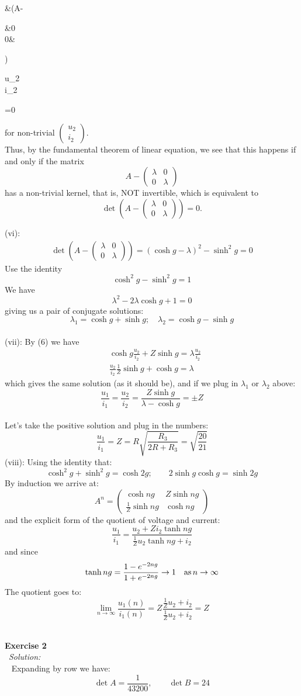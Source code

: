 \documentclass[12pt]{article}
\def\lam{\lambda}
\def\es#1#2{{\bf Exercise #1}\\~{\it Solution:}\\~#2\\[1em]}
\def\inn#1#2{(#1): #2\\[0.5em]}
\def\ff#1#2{\frac{#1}{#2}}
\newcommand{\eq}[1]{\begin{align*}#1\end{align*}}
\newcommand{\mm}[1]{\begin{pmatrix}#1\end{pmatrix}}
\def\sq#1{\sqrt{#1}}
\begin{document}
{{{{	&\iff \left(A-\mm{\lam&0\\0&\lam}\right)\mm{u_2\\i_2}=0
	}
	for non-trivial $\mm{u_2\\i_2}$.\\[0.7 em]
	Thus, by the fundamental theorem of linear equation, we see that this happens if and only if the matrix
	\[
	A-\mm{\lam&0\\0&\lam}
	\]
	has a non-trivial kernel, that is, NOT invertible, which is equivalent to
	\[
	\det\left(A-\mm{\lam&0\\0&\lam}\right)=0.
	\]
	}
	\inn{vi}{
	\eq{
	\det\left(A-\mm{\lam&0\\0&\lam}\right)=(\cosh g-\lambda)^2-\sinh^2 g=0
	}
	Use the identity 
	\[
	\cosh^2g-\sinh^2g=1
	\]
	We have 
	\[
	\lam^2-2\lam\cosh g+1=0
	\]
	giving us a pair of conjugate solutions:
	\[
	\lam_1=\cosh g+\sinh g;\quad\lam_2=\cosh g-\sinh g
	\]
	}
	\inn{vii}{
	By (6) we have
	\eq{
	&\cosh g \frac{u_2}{i_2}+Z\sinh g =\lambda \frac{u_2}{i_2}\\
	&\frac{u_2}{i_2}\frac{1}{Z}\sinh g+\cosh g=\lambda
	}
	which gives the same solution (as it should be), and if we plug in $\lambda_1$ or $\lambda_2$ above:
	\[
	\frac{u_1}{i_1}=\frac{u_2}{i_2}=\frac{Z\sinh g}{\lambda-\cosh g}=\pm Z
	\]
	}
	Let's take the positive solution and plug in the numbers:
	\[
	\frac{u_1}{i_1}=Z=R\sq{\ff{R_3}{2R+R_3}}=\sqrt{\frac{20}{21}}
	\]
	\inn{viii}{
	Using the identity that:
	\[
	\cosh^2g+\sinh^2g=\cosh2g;\qquad2\sinh g\cosh g=\sinh2g
	\]
	By induction we arrive at:
	\[
	A^n=\mm{\cosh ng&Z\sinh ng\\ \ff{1}{Z}\sinh ng&\cosh ng}
	\]
	and the explicit form of the quotient of voltage and current:
	\[
	\ff{u_1}{i_1}=\ff{u_2+Zi_2\tanh ng}{\ff{1}{Z}u_2\tanh ng +i_2}
	\]
	and since
	\[
	\tanh ng=\ff{1-e^{-2ng}}{1+e^{-2ng}}\to 1\quad \hbox{\rm as}\, n\to \infty
	\]
	The quotient goes to:
	\[
	\lim_{n\to\infty}\ff{u_1(n)}{i_1(n)}=Z \ff{\ff{1}{Z}u_2+i_2}{\ff{1}{Z}u_2 +i_2}=Z
	\]
	}
	}
}
\es{2}{
Expanding by row we have:
\[
\det A=\frac{1}{43200},\qquad\det B=24
\]
}
\end{document}
